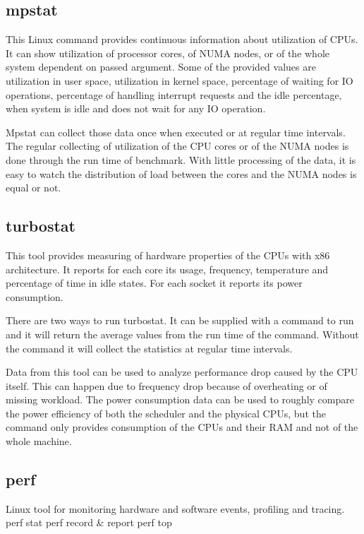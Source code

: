\subsection{mpstat}
This Linux command provides continuous information about utilization of CPUs. It
can show utilization of processor cores, of NUMA nodes, or of the whole system
dependent on passed argument. Some of the provided values are utilization in
user space, utilization in kernel space, percentage of waiting for IO
operations, percentage of handling interrupt requests and the idle percentage,
when system is idle and does not wait for any IO operation.

Mpstat can collect those data once when executed or at regular time intervals.
The regular collecting of utilization of the CPU cores or of the NUMA nodes is
done through the run time of benchmark. With little processing of the data, it
is easy to watch the distribution of load between the cores and the NUMA nodes
is equal or not.

\subsection{turbostat}
This tool provides measuring of hardware properties of the CPUs with x86
architecture. It reports for each core its usage, frequency, temperature and
percentage of time in idle states. For each socket it reports its power consumption.

There are two ways to run turbostat. It can be supplied with a command to run
and it will return the average values from the run time of the command. Without
the command it will collect the statistics at regular time intervals.

Data from this tool can be used to analyze performance drop caused by the CPU
itself. This can happen due to frequency drop because of overheating or of
missing workload. The power consumption data can be used to roughly compare the
power efficiency of both the scheduler and the physical CPUs, but the command
only provides consumption of the CPUs and their RAM and not of the whole
machine.


\subsection{perf}
Linux tool for monitoring hardware and software events, profiling and tracing.
perf stat
perf record \& report
perf top




